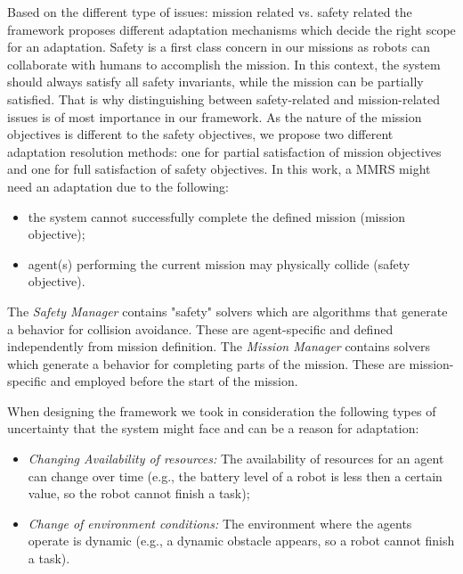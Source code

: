 \documentclass[journal]{IEEEtran}
\theoremstyle{definition}
\begin{document}
Based on the different type of issues: mission related vs. safety related the framework proposes different adaptation mechanisms which decide the right scope  for an  %
adaptation. 
  Safety is a first class concern in our missions as robots can collaborate with humans to accomplish the mission. In this context, the system should always satisfy all safety invariants, while the mission can be partially satisfied.
  That is why distinguishing between safety-related and mission-related issues is of most importance in our framework.
 As the nature of the mission objectives is different to the safety objectives, we propose two different adaptation resolution methods: one for partial satisfaction of mission objectives and one for full satisfaction
of safety objectives. 
 In this work, a MMRS might need 
 an adaptation due to the following:
\begin{itemize}
\item the system cannot successfully complete the defined mission (mission objective);
\item agent(s) performing the current mission may physically collide (safety objective). 
\end{itemize}
 The \textit{Safety Manager} contains "safety" solvers which are algorithms that generate a behavior for collision avoidance. These are agent-specific and defined independently from mission definition. The \textit{Mission Manager} contains solvers which generate a behavior for completing parts of the mission. These are mission-specific and employed  before the start of the mission.


When designing the framework we took in consideration the following types of uncertainty that the system might face and can be a reason for adaptation:
\begin{itemize}
\item \textit{Changing Availability of resources:} The availability of resources for an agent can change over time (e.g., the battery level of a robot is less then a certain value, so the robot cannot finish a task);
\item \textit{Change of environment conditions:} The environment where the agents operate is dynamic (e.g., a dynamic obstacle appears, so a robot cannot finish a task).
\end{itemize}
\end{document}
